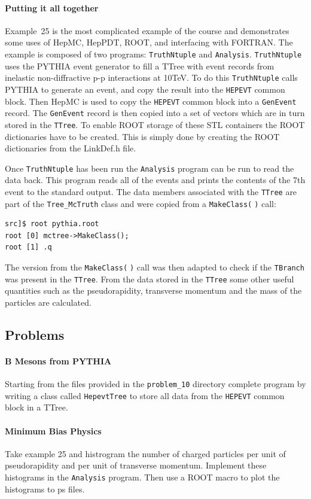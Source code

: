 \documentclass[11pt,a4paper]{scrartcl}
\begin{document}
\paragraph{Putting it all together}
Example~25 is the most complicated example of the course and
demonstrates some uses of HepMC, HepPDT, ROOT, and interfacing with
FORTRAN.  The example is composed of two programs:
\texttt{TruthNtuple} and \texttt{Analysis}.  \texttt{TruthNtuple} uses 
the PYTHIA event generator to fill a TTree with event records from
inelastic non-diffractive p-p interactions at 10TeV.  To do this
\texttt{TruthNtuple} calls PYTHIA to generate an event, and copy the
result into the \texttt{HEPEVT} common block.  Then HepMC is used to
copy the \texttt{HEPEVT} common block into a \texttt{GenEvent} record.
The \texttt{GenEvent} record is then copied into a set of vectors
which are in turn stored in the \texttt{TTree}.  To enable ROOT
storage of these STL containers the ROOT dictionaries have to be
created.  This is simply done by creating the ROOT dictionaries from
the LinkDef.h file.

Once \texttt{TruthNtuple} has been run the \texttt{Analysis} program
can be run to read the data back.  This program reads all of the
events and prints the contents of the 7th event to the standard
output.  The data members associated with the \texttt{TTree} are part
of the \texttt{Tree\_McTruth} class and were copied from a
\texttt{MakeClass($\;$)} call:
\begin{verbatim}
src]$ root pythia.root
root [0] mctree->MakeClass();
root [1] .q
\end{verbatim} %
The version from the \texttt{MakeClass($\;$)} call was then adapted to
check if the \texttt{TBranch} was present in the \texttt{TTree}.  From
the data stored in the \texttt{TTree} some other useful quantities
such as the pseudorapidity, transverse momentum and the mass of the
particles are calculated.


\subsection{Problems}

\paragraph{B Mesons from PYTHIA}
Starting from the files provided in the \texttt{problem\_10} directory
complete program by writing a class called \texttt{HepevtTree} to
store all data from the \texttt{HEPEVT} common block in a TTree.

\paragraph{Minimum Bias Physics}
Take example 25 and histrogram the number of charged particles per
unit of pseudorapidity and per unit of transverse momentum.  Implement
these histograms in the \texttt{Analysis} program.  Then use a ROOT
macro to plot the histograms to ps files.



\end{document}
